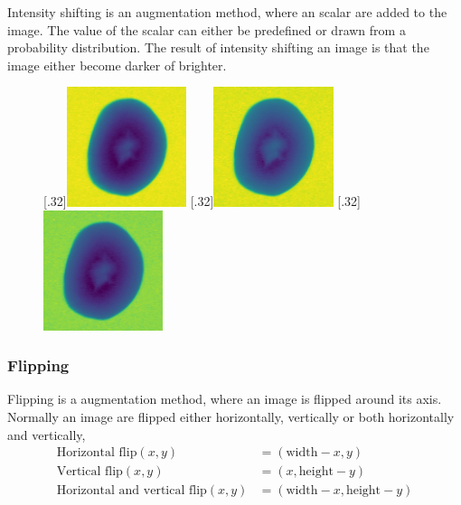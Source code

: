 \documentclass[11pt]{article}
\begin{document}
Intensity shifting is an augmentation method, where an scalar are added to the image. The value of the scalar can either be predefined or drawn from a probability distribution. The result of intensity shifting an image is that the image either become darker of brighter.

\begin{figure}[H]
\centering
{}
  [.32\textwidth]{\includegraphics[height=3.5cm]{figurer/hollow_15.jpg}}
  [.32\textwidth]{\includegraphics[height=3.5cm]{figurer/data_augmentation/shifting1.jpg}}
  [.32\textwidth]{\includegraphics[height=3.5cm]{figurer/data_augmentation/shifting2.jpg}}
\end{figure}



\subsubsection{Flipping}

Flipping is a augmentation method, where an image is flipped around its axis. Normally an image are flipped either horizontally, vertically or both horizontally and vertically,
\begin{equation}
\begin{split}
    \text{Horizontal flip}(x, y) &= (\text{width} - x, y) \\
    \text{Vertical flip}(x, y) &= (x, \text{height} - y) \\
    \text{Horizontal and vertical flip}(x, y) &= (\text{width} - x, \text{height} - y)
\end{split}
\end{equation}
\end{document}
